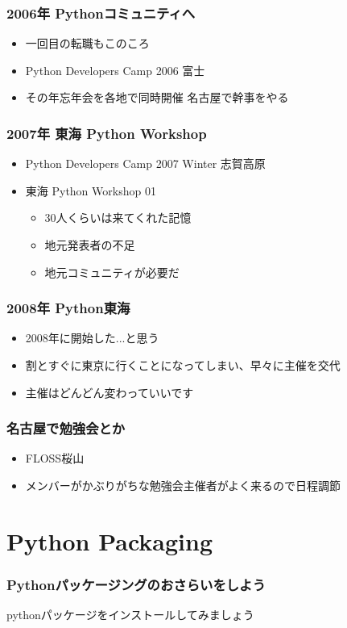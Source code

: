 \documentclass[aspectratio=169]{beamer}
\begin{document}
\begin{frame}
\frametitle{2006年 Pythonコミュニティへ}
\begin{itemize}
\item 一回目の転職もこのころ
\item Python Developers Camp 2006 富士
\item その年忘年会を各地で同時開催 名古屋で幹事をやる
\end{itemize}
\end{frame}

\begin{frame}
\frametitle{2007年 東海 Python Workshop}
\begin{itemize}
\item Python Developers Camp 2007 Winter 志賀高原
\item 東海 Python Workshop 01
\begin{itemize}
\item 30人くらいは来てくれた記憶
\item 地元発表者の不足
\item 地元コミュニティが必要だ
\end{itemize}
\end{itemize}
\end{frame}

\begin{frame}
\frametitle{2008年 Python東海}
\begin{itemize}
\item 2008年に開始した...と思う
\item 割とすぐに東京に行くことになってしまい、早々に主催を交代
\item 主催はどんどん変わっていいです
\end{itemize}
\end{frame}

\begin{frame}
\frametitle{名古屋で勉強会とか}
\begin{itemize}
\item FLOSS桜山
\item メンバーがかぶりがちな勉強会主催者がよく来るので日程調節
\end{itemize}
\end{frame}

\section{Python Packaging}

\begin{frame}
\frametitle{Pythonパッケージングのおさらいをしよう}
\begin{large}
pythonパッケージをインストールしてみましょう
\end{large}
\end{frame}
\end{document}
